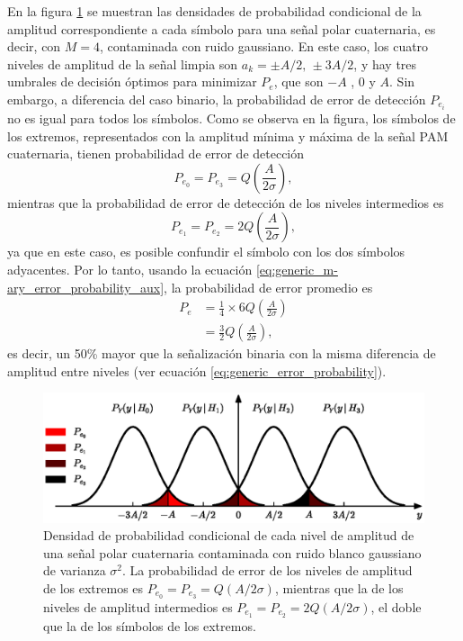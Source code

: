 \documentclass[a4paper]{article}
\begin{document}
En la figura \ref{fig:quaternary_gaussian_noise} se muestran las densidades de probabilidad condicional de la amplitud correspondiente a cada símbolo para una señal polar cuaternaria, es decir, con \(M=4\), contaminada con ruido gaussiano. En este caso, los cuatro niveles de amplitud de la señal limpia son \(a_k=\pm A/2,\,\pm 3A/2\), y hay tres umbrales de decisión óptimos para minimizar \(P_e\), que son \(-A\) , 0 y \(A\). Sin embargo, a diferencia del caso binario, la probabilidad de error de detección \(P_{e_i}\) no es igual para todos los símbolos. Como se observa en la figura, los símbolos de los extremos, representados con la amplitud mínima y máxima de la señal PAM cuaternaria, tienen probabilidad de error de detección
\[
 P_{e_0}=P_{e_3}=Q\left(\frac{A}{2\sigma}\right),
\]
mientras que la probabilidad de error de detección de los niveles intermedios es
\[
 P_{e_1}=P_{e_2}=2Q\left(\frac{A}{2\sigma}\right),
\]
ya que en este caso, es posible confundir el símbolo con los dos símbolos adyacentes. Por lo tanto, usando la ecuación \ref{eq:generic_m-ary_error_probability_aux}, la probabilidad de error promedio es
\begin{align*}
 P_e&=\frac{1}{4}\times6Q\left(\frac{A}{2\sigma}\right)\\
    &=\frac{3}{2}Q\left(\frac{A}{2\sigma}\right),
\end{align*}
es decir, un 50\% mayor que la señalización binaria con la misma diferencia de amplitud entre niveles (ver ecuación \ref{eq:generic_error_probability}).
\begin{figure}[!htb]
\begin{center}
\includegraphics[width=0.9\columnwidth]{figuras/quaternary_gaussian_noise.eps}
\caption{\label{fig:quaternary_gaussian_noise} Densidad de probabilidad condicional de cada nivel de amplitud de una señal polar cuaternaria contaminada con ruido blanco gaussiano de varianza \(\sigma^2\).  La probabilidad de error de los niveles de amplitud de los extremos es \(P_{e_0}=P_{e_3}=Q(A/2\sigma)\), mientras que la de los niveles de amplitud intermedios es \(P_{e_1}=P_{e_2}=2Q(A/2\sigma)\), el doble que la de los símbolos de los extremos.}
\end{center}
\end{figure}
\end{document}
